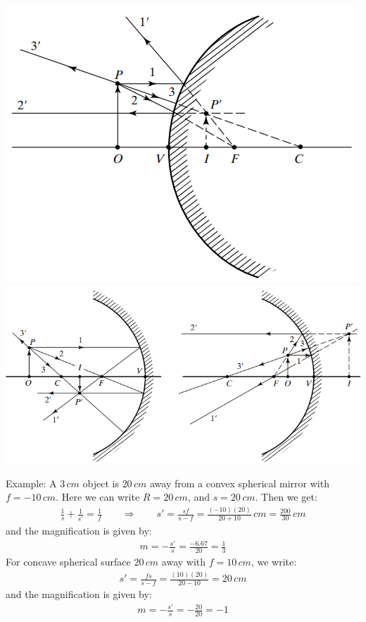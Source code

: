 \documentclass[11pt]{book}
\theoremstyle{break}
\theoremstyle{break}
\newcommand{\example}{\color{green}Example: \color{black}}
\begin{document}
\hfill\break
\hfill\break
\begin{center}
\includegraphics[scale=0.42]{drawRefle.png}
\includegraphics[scale=0.42]{drawRefle1.png}
\end{center}

\newpage
\example
A $3\, cm$ object is $20\, cm$ away from a convex spherical mirror with $f = -10\, cm$. Here we can write $R = 20\, cm$, and $s = 20\, cm$. Then we get:
\begin{align*}
\frac{1}{s}+\frac{1}{s'} = \frac{1}{f} \qquad\Rightarrow \qquad s'=\frac{sf}{s-f} = \frac{(-10)(20)}{20 +10}\, cm = \frac{200}{30}\, cm
\end{align*}
and the magnification is given by:
\begin{align*}
m = -\frac{s'}{s} = \frac{-6.67}{20} = \frac{1}{3}
\end{align*}
For concave spherical surface $20\, cm$ away with $f = 10\, cm$, we write:
\begin{align*}
s' = \frac{fs}{s-f} = \frac{(10)(20)}{20-10} = 20\, cm
\end{align*}
and the magnification is given by:
\begin{align*}
m = -\frac{s'}{s} =- \frac{20}{20} = -1
\end{align*}
\hfill\break
\hfill\break
\end{document}
